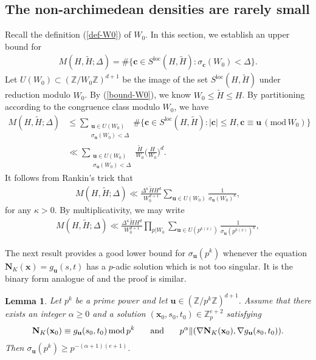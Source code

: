 \documentclass[reqno, 11pt]{amsart}
\renewcommand{\leq}{\leqslant}
\renewcommand{\geq}{\geqslant}
\newtheorem{lemma}[theorem]{Lemma}
\theoremstyle{definition}
\theoremstyle{definition}
\renewcommand{\geq}{\geqslant}
\renewcommand{\leq}{\leqslant}
\renewcommand{\mod}{\mathrm{mod}\,}
\newcommand{\cc}{\mathbf{c}}
\newcommand{\uu}{\mathbf{u}}
\newcommand{\xx}{\mathbf{x}}
\newcommand{\ZZ}{\mathbb{Z}}
\newcommand{\NNN}{\mathbf{N}}
\numberwithin{equation}{section}
\begin{document}
\subsection{The non-archimedean densities are rarely small}
Recall the definition (\ref{def-W0}) of $W_0$.
In this section, we establish an upper bound for
\begin{align*}
	M(H, \tilde{H}; \Delta) = \#\{\cc \in S^{\mathrm{loc}}(H, \tilde{H}): \sigma_\cc(W_0) < \Delta \}.
\end{align*}
Let $U(W_0) \subset (\ZZ / W_0 \ZZ)^{d+1}$ be the image of the set $S^{\mathrm{loc}}(H, \tilde{H})$ under reduction modulo $W_0$. By (\ref{bound-W0}), we know $W_0 \leq \tilde{H} \leq H$. By partitioning according to the congruence class modulo $W_0$, we have
\begin{align*}
	M(H, \tilde{H}; \Delta) & \leq \sum_{\substack{\uu \in U(W_0) \\ \sigma_\uu(W_0) < \Delta}} \# \{ \cc \in S^{\mathrm{loc}}(H, \tilde{H}): |\cc| \leq H, \cc \equiv \uu \, (\mod W_0) \} \\
	& \ll \sum_{\substack{\uu \in U(W_0) \\ \sigma_\uu(W_0) < \Delta}} \frac{\tilde{H}}{W_0} \Big( \frac{H}{W_0} \Big)^d.
\end{align*}
It follows from Rankin's trick that
\begin{align*}
	M(H, \tilde{H}; \Delta) \ll \frac{\Delta^\kappa \tilde{H} H^d}{W_0^{d+1}} \sum_{\uu \in U(W_0)} \frac{1}{\sigma_\uu(W_0)^\kappa},
\end{align*}
for any $\kappa > 0$.
By multiplicativity, we may write
\begin{align}\label{final}
	M(H, \tilde{H}; \Delta) \ll \frac{\Delta^\kappa \tilde{H} H^d}{W_0^{d+1}} \prod_{p | W_0} \sum_{\uu \in U(p^{k(x)})} \frac{1}{\sigma_\uu(p^{k(x)})^\kappa},
\end{align}

The next result provides a good lower bound for $\sigma_\uu(p^k)$ whenever the equation $\NNN_K(\xx) = g_\uu(s,t)$ has a $p$-adic solution which is not too singular. It is the binary form analogue of \cite[Lemma 9.5]{BST} and the proof is similar.

\begin{lemma}\label{hensel}
	Let $p^k$ be a prime power and let $\uu \in (\ZZ / p^k \ZZ)^{d+1}$. Assume that there exists an integer $\alpha \geq 0$ and a solution $(\xx_0, s_0, t_0) \in \ZZ_p^{e+2}$ satisfying
	\begin{align}\label{eq:goat}
		\NNN_K(\xx_0) \equiv g_\uu(s_0, t_0) \, \mod p^k \text{ \indent  and \indent } p^\alpha \| (\nabla \NNN_K(\xx_0), \nabla g_\uu(s_0, t_0)).
	\end{align}
	Then $\sigma_\uu(p^k) \geq p^{-(\alpha+1)(e+1)}$.
\end{lemma}
\end{document}
